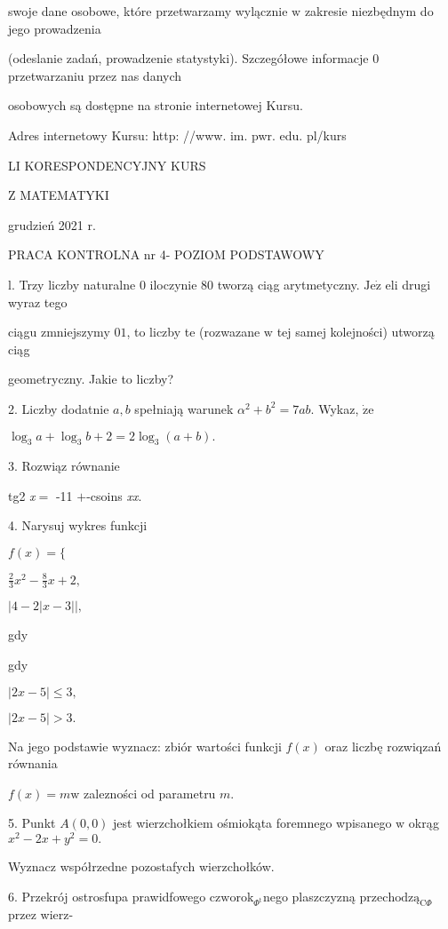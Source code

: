 \documentclass[a4paper,12pt]{article}
\begin{document}
swoje dane osobowe, które przetwarzamy wylącznie $\mathrm{w}$ zakresie niezbędnym do jego prowadzenia

(odeslanie zadań, prowadzenie statystyki). Szczegółowe informacje $0$ przetwarzaniu przez nas danych

osobowych są dostępne na stronie internetowej Kursu.

Adres internetowy Kursu: http: //www. im. pwr. edu. pl/kurs







LI KORESPONDENCYJNY KURS

Z MATEMATYKI

grudzień 2021 r.

PRACA KONTROLNA nr 4- POZIOM PODSTAWOWY

l. Trzy liczby naturalne $0$ iloczynie 80 tworzą ciąg arytmetyczny. $\mathrm{J}\mathrm{e}\dot{\mathrm{z}}$ eli drugi wyraz tego

ciągu zmniejszymy $0 1$, to liczby te (rozwazane $\mathrm{w}$ tej samej kolejności) utworzą ciąg

geometryczny. Jakie to liczby?

2. Liczby dodatnie $a, b$ spełniają warunek $\alpha^{2}+b^{2}=7ab$. Wykaz, $\dot{\mathrm{z}}\mathrm{e}$

$\log_{3}a+\log_{3}b+2=2\log_{3}(a+b).$

3. Rozwiąz równanie

tg2 {\it x}$=$ -11 $+$-csoins {\it xx}.

4. Narysuj wykres funkcji

$f(x)=\{$

$\displaystyle \frac{2}{3}x^{2}-\frac{8}{3}x+2,$

$|4-2|x-3||,$

gdy

gdy

$|2x-5|\leq 3,$

$|2x-5|>3.$

Na jego podstawie wyznacz: zbiór wartości funkcji $f(x)$ oraz liczbę rozwiqzań równania

$f(x)=m \mathrm{w}$ zalezności od parametru $m.$

5. Punkt $A(0,0)$ jest wierzchołkiem ośmiokąta foremnego wpisanego $\mathrm{w}$ okrąg $x^{2}-2x+y^{2}=0.$

Wyznacz współrzedne pozostafych wierzchołków.

6. Przekrój ostrosfupa prawidfowego $\mathrm{c}\mathrm{z}\mathrm{w}\mathrm{o}\mathrm{r}\mathrm{o}\mathrm{k}_{\Phi^{\mathrm{t}}}$nego plaszczyzną $\mathrm{p}\mathrm{r}\mathrm{z}\mathrm{e}\mathrm{c}\mathrm{h}\mathrm{o}\mathrm{d}\mathrm{z}\text{ą}_{\mathrm{C}\Phi}$ przez wierz-
\end{document}
